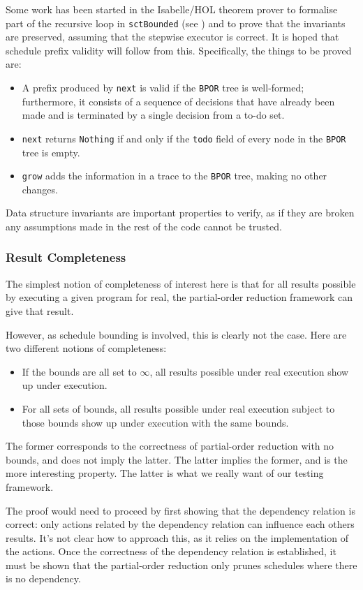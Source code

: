 Some work has been started in the Isabelle/HOL theorem prover to
formalise part of the recursive loop in \verb|sctBounded| (see
) and to prove that the invariants are preserved,
assuming that the stepwise executor is correct. It is hoped that
schedule prefix validity will follow from this. Specifically, the
things to be proved are:

\begin{itemize}
\item A prefix produced by \verb|next| is valid if the \verb|BPOR|
  tree is well-formed; furthermore, it consists of a sequence of
  decisions that have already been made and is terminated by a single
  decision from a to-do set.

\item \verb|next| returns \verb|Nothing| if and only if the
  \verb|todo| field of every node in the \verb|BPOR| tree is empty.

\item \verb|grow| adds the information in a trace to the \verb|BPOR|
  tree, making no other changes.
\end{itemize}

Data structure invariants are important properties to verify, as if
they are broken any assumptions made in the rest of the code cannot be
trusted.

\subsubsection{Result Completeness}
\label{sec:correctness-testing-complete}

The simplest notion of completeness of interest here is that for all
results possible by executing a given program for real, the
partial-order reduction framework can give that result.

However, as schedule bounding is involved, this is clearly not the
case. Here are two different notions of completeness:

\begin{itemize}
\item If the bounds are all set to $\infty$, all results possible
  under real execution show up under \dejafu{} execution.

\item For all sets of bounds, all results possible under real
  execution subject to those bounds show up under \dejafu{} execution
  with the same bounds.
\end{itemize}

The former corresponds to the correctness of partial-order reduction
with no bounds, and does not imply the latter. The latter implies the
former, and is the more interesting property. The latter is what we
really want of our testing framework.

The proof would need to proceed by first showing that the dependency
relation is correct: only actions related by the dependency relation
can influence each others results. It's not clear how to approach
this, as it relies on the implementation of the actions. Once the
correctness of the dependency relation is established, it must be
shown that the partial-order reduction only prunes schedules where
there is no dependency.
